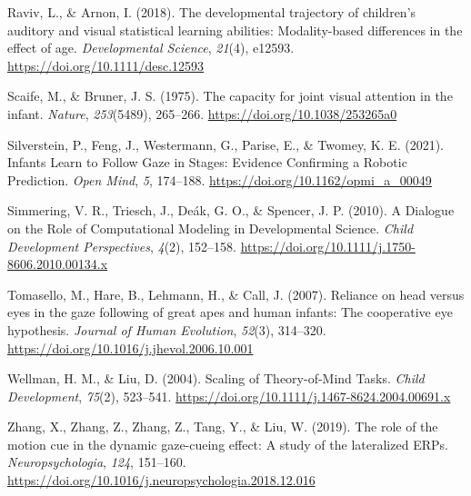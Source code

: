 \documentclass[
  man,floatsintext]{apa6}
\newlength{\cslhangindent}
\newlength{\cslentryspacingunit} %
\newenvironment{CSLReferences}[2] %
 {%
  \setlength{\parindent}{0pt}
  \ifodd #1
  \let\oldpar\par
  \def\par{\hangindent=\cslhangindent\oldpar}
  \fi
  \setlength{\parskip}{#2\cslentryspacingunit}
 }%
 {}
\begin{document}
\begin{CSLReferences}{1}{0}
\leavevmode{}%
Raviv, L., \& Arnon, I. (2018). The developmental trajectory of children's auditory and visual statistical learning abilities: Modality-based differences in the effect of age. \emph{Developmental Science}, \emph{21}(4), e12593. \url{https://doi.org/10.1111/desc.12593}

\leavevmode{}%
Scaife, M., \& Bruner, J. S. (1975). The capacity for joint visual attention in the infant. \emph{Nature}, \emph{253}(5489), 265--266. \url{https://doi.org/10.1038/253265a0}

\leavevmode{}%
Silverstein, P., Feng, J., Westermann, G., Parise, E., \& Twomey, K. E. (2021). Infants {Learn} to {Follow Gaze} in {Stages}: {Evidence Confirming} a {Robotic Prediction}. \emph{Open Mind}, \emph{5}, 174--188. \url{https://doi.org/10.1162/opmi_a_00049}

\leavevmode{}%
Simmering, V. R., Triesch, J., Deák, G. O., \& Spencer, J. P. (2010). A {Dialogue} on the {Role} of {Computational Modeling} in {Developmental Science}. \emph{Child Development Perspectives}, \emph{4}(2), 152--158. \url{https://doi.org/10.1111/j.1750-8606.2010.00134.x}

\leavevmode{}%
Tomasello, M., Hare, B., Lehmann, H., \& Call, J. (2007). Reliance on head versus eyes in the gaze following of great apes and human infants: The cooperative eye hypothesis. \emph{Journal of Human Evolution}, \emph{52}(3), 314--320. \url{https://doi.org/10.1016/j.jhevol.2006.10.001}

\leavevmode{}%
Wellman, H. M., \& Liu, D. (2004). Scaling of {Theory-of-Mind Tasks}. \emph{Child Development}, \emph{75}(2), 523--541. \url{https://doi.org/10.1111/j.1467-8624.2004.00691.x}

\leavevmode{}%
Zhang, X., Zhang, Z., Zhang, Z., Tang, Y., \& Liu, W. (2019). The role of the motion cue in the dynamic gaze-cueing effect: {A} study of the lateralized {ERPs}. \emph{Neuropsychologia}, \emph{124}, 151--160. \url{https://doi.org/10.1016/j.neuropsychologia.2018.12.016}

\end{CSLReferences}

\endgroup

\newpage
\end{document}
